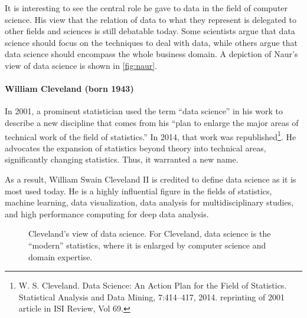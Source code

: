 It is interesting to see the central role he gave to data in the field of computer
science. His view that the relation of data to what they represent is delegated to other
fields and sciences is still debatable today.  Some scientists argue that data science
should focus on the techniques to deal with data, while others argue that data science
should encompass the whole business domain.  A depiction of Naur's view of data science is
shown in \cref{fig:naur}.

\def\clevelandds{(0,0) circle (20mm)}
\def\clevelandst{(0:-5mm) circle (15mm)}
\def\clevelandde {(2,1) circle (15mm)}
\def\clevelandcs {(2,-1) circle (15mm)}

\paragraph{William Cleveland (born 1943)}

In 2001, a prominent statistician used the term ``data science'' in his work to describe a
new discipline that comes from his ``plan to enlarge the major areas of technical work of
the field of statistics.''
In 2014, that work was republished\footnote{W. S. Cleveland.
Data Science: An Action Plan for the Field of Statistics. Statistical Analysis and Data
Mining, 7:414–417, 2014. reprinting of 2001 article in ISI Review, Vol 69.}.
He advocates the expansion of statistics beyond theory into technical areas, significantly
changing statistics.  Thus, it warranted a new name.

As a result, William Swain Cleveland II is credited to define data science as it is most
used today. He is a highly influential figure in the fields of statistics, machine
learning, data visualization, data analysis for multidisciplinary studies, and high
performance computing for deep data analysis.

\begin{figure}
  \centering
  \caption{
    Cleveland's view of data science.
    For Cleveland, data science is the ``modern'' statistics,
    where it is enlarged by computer science and domain expertise.
  }
  \label{fig:cleveland}
\end{figure}

